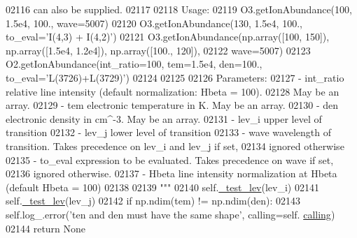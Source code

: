 \begin{DoxyCode}
{{02116 \textcolor{stringliteral}{        can also be supplied.}
02117 \textcolor{stringliteral}{}
02118 \textcolor{stringliteral}{        Usage:}
02119 \textcolor{stringliteral}{            O3.getIonAbundance(100, 1.5e4, 100., wave=5007)}
02120 \textcolor{stringliteral}{            O3.getIonAbundance(130, 1.5e4, 100., to\_eval='I(4,3) + I(4,2)')}
02121 \textcolor{stringliteral}{            O3.getIonAbundance(np.array([100, 150]), np.array([1.5e4, 1.2e4]), np.array([100., 120]), }
02122 \textcolor{stringliteral}{                wave=5007)}
02123 \textcolor{stringliteral}{            O2.getIonAbundance(int\_ratio=100, tem=1.5e4, den=100., to\_eval='L(3726)+L(3729)')}
02124 \textcolor{stringliteral}{}
02125 \textcolor{stringliteral}{            }
02126 \textcolor{stringliteral}{        Parameters:}
02127 \textcolor{stringliteral}{            - int\_ratio    relative line intensity (default normalization: Hbeta = 100). }
02128 \textcolor{stringliteral}{                            May be an array.}
02129 \textcolor{stringliteral}{            - tem          electronic temperature in K. May be an array.}
02130 \textcolor{stringliteral}{            - den          electronic density in cm^-3. May be an array.}
02131 \textcolor{stringliteral}{            - lev\_i        upper level of transition}
02132 \textcolor{stringliteral}{            - lev\_j        lower level of transition}
02133 \textcolor{stringliteral}{            - wave         wavelength of transition. Takes precedence on lev\_i and lev\_j if set, }
02134 \textcolor{stringliteral}{                            ignored otherwise }
02135 \textcolor{stringliteral}{            - to\_eval      expression to be evaluated. Takes precedence on wave if set, }
02136 \textcolor{stringliteral}{                            ignored otherwise.}
02137 \textcolor{stringliteral}{            - Hbeta        line intensity normalization at Hbeta (default Hbeta = 100)}
02138 \textcolor{stringliteral}{        }
02139 \textcolor{stringliteral}{        """}
02140         self.\hyperlink{classpyneb_1_1core_1_1pynebcore_1_1_atom_ade3de73e8bdb814d01d2d9af98eba87f}{\_test\_lev}(lev\_i)
02141         self.\hyperlink{classpyneb_1_1core_1_1pynebcore_1_1_atom_ade3de73e8bdb814d01d2d9af98eba87f}{\_test\_lev}(lev\_j)
02142         \textcolor{keywordflow}{if} np.ndim(tem) != np.ndim(den):
02143             self.log\_.error(\textcolor{stringliteral}{'ten and den must have the same shape'}, calling=self.
      \hyperlink{classpyneb_1_1core_1_1pynebcore_1_1_atom_a373b7735acf4f528b54bddf373ad67a1}{calling})
02144             \textcolor{keywordflow}{return} \textcolor{keywordtype}{None}
}}
\end{DoxyCode}
